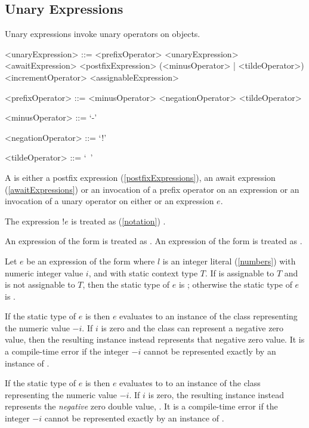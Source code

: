 \documentclass[makeidx]{article}
\begin{document}
{\subsection{Unary Expressions}

\LMHash{}%
Unary expressions invoke unary operators on objects.

\begin{grammar}
<unaryExpression> ::= <prefixOperator> <unaryExpression>
  \alt <awaitExpression>
  \alt <postfixExpression>
  \alt (<minusOperator> | <tildeOperator>) \SUPER{}
  \alt <incrementOperator> <assignableExpression>

<prefixOperator> ::= <minusOperator>
  \alt <negationOperator>
  \alt <tildeOperator>

<minusOperator> ::= `-'

<negationOperator> ::= `!'

<tildeOperator> ::= `~'
\end{grammar}

\LMHash{}%
A  is either a postfix expression (\ref{postfixExpressions}), an await expression (\ref{awaitExpressions}) or an invocation of a prefix operator on an expression or an invocation of a unary operator on either \SUPER{} or an expression $e$.

\LMHash{}%
The expression $!e$ is treated as
(\ref{notation})
.

\LMHash{}%
An expression of the form  is treated as
.
An expression of the form  is treated as
.

\LMHash{}%
Let $e$ be an expression of the form 
where $l$ is an integer literal (\ref{numbers}) with numeric integer value $i$,
and with static context type $T$.
If  is assignable to $T$ and  is not assignable to $T$,
then the static type of $e$ is ;
otherwise the static type of $e$ is .

\LMHash{}%
If the static type of $e$ is  then $e$ evaluates to
an instance of the  class representing the numeric value $-i$.
If $i$ is zero and the  class can represent a negative zero value,
then the resulting instance instead represents that negative zero value.
It is a compile-time error if the integer $-i$ cannot be represented
exactly by an instance of .

\LMHash{}%
If the static type of $e$ is  then $e$ evaluates to
to an instance of the  class representing the numeric value $-i$.
If $i$ is zero, the resulting instance instead represents the
\emph{negative} zero double value, .
It is a compile-time error if the integer $-i$ cannot be represented
exactly by an instance of .

}
\end{document}
